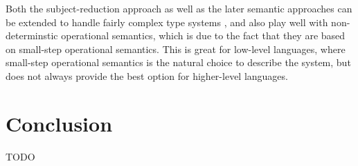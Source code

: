 \documentclass[a4paper,draft,preprint,sort&compress]{elsarticle}
\begin{document}
Both the subject-reduction approach as well as the later semantic approaches
can be extended to handle fairly complex type systems \cite{Pierce02}, and also play well with
non-determinstic operational semantics, which is due to the fact that they are
based on small-step operational semantics. This is great for low-level languages,
where small-step operational semantics is the natural choice to describe the
system, but does not always provide the best option for higher-level languages.


\section{Conclusion}
\label{sec:Conclusion}


TODO




\end{document}
